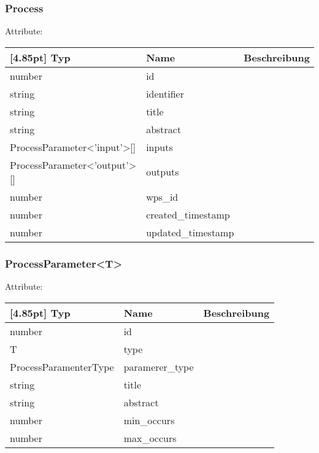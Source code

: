     		\subsubsection{Process}
    		
    		Attribute:
                \begin{center}
                	\renewcommand{\arraystretch}{1.5}
    	            \setlength\tabcolsep{5pt}
                	\begin{tabularx}{\textwidth}{|l|l|X|}
                		\hline
                        \rowcolor[gray]{0.75}[4.85pt]
                	    Typ & Name & Beschreibung \\ \hline
                		number & id &  \\ \hline
                		string & identifier & \\ \hline
                		string & title &  \\ \hline
                		string & abstract &  \\ \hline
                        ProcessParameter<'input'>[] & inputs &  \\ \hline
                        ProcessParameter<'output'>[] & outputs &  \\ \hline
                		number & wps_id &  \\ \hline
                		number & created_timestamp &  \\ \hline
                		number & updated_timestamp &  \\ \hline
                	\end{tabularx}
                \end{center}
                
    		\subsubsection{ProcessParameter<T>}
    		
    		Attribute:
                \begin{center}
                	\renewcommand{\arraystretch}{1.5}
    	            \setlength\tabcolsep{5pt}
                	\begin{tabularx}{\textwidth}{|l|l|X|}
                		\hline
                        \rowcolor[gray]{0.75}[4.85pt]
                	    Typ & Name & Beschreibung \\ \hline
                		number & id &  \\ \hline
                		T & type &  \\ \hline
                		ProcessParamenterType & paramerer_type &  \\ \hline
                		string & title &  \\ \hline
                		string & abstract &  \\ \hline
                		number & min_occurs &  \\ \hline
                		number & max_occurs &  \\ \hline
                	\end{tabularx}
                \end{center}
                
